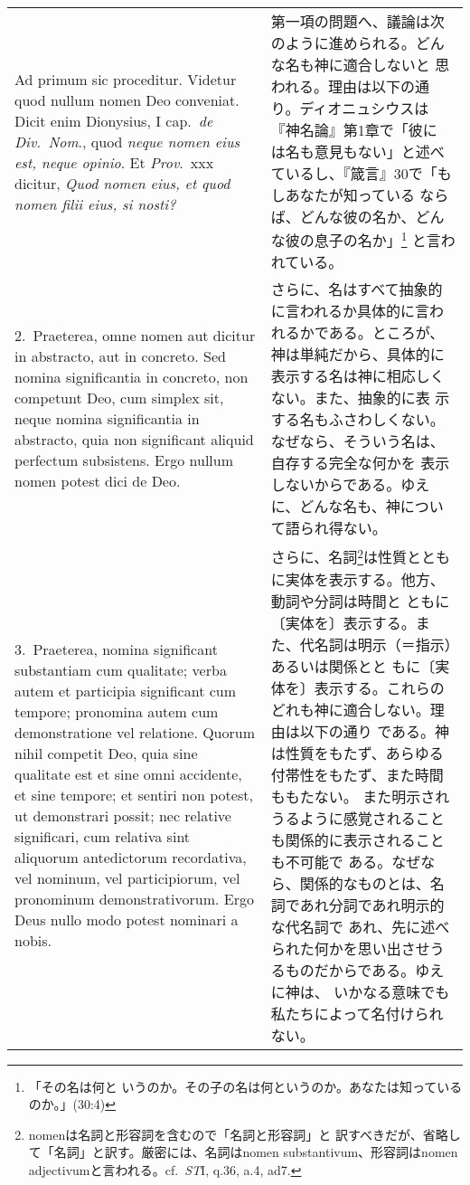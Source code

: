 \documentclass[10pt]{jsarticle}
\begin{document}
\begin{longtable}{p{21em}p{21em}}

{\sc Ad primum sic proceditur}. Videtur quod nullum nomen Deo
conveniat. Dicit enim Dionysius, I cap.\ {\it de Div.\ Nom}., quod {\it neque nomen
eius est, neque opinio}. Et {\it Prov}.\ {\sc xxx} dicitur, {\it Quod nomen eius, et quod nomen filii eius, si nosti?}

&

第一項の問題へ、議論は次のように進められる。どんな名も神に適合しないと
思われる。理由は以下の通り。ディオニュシウスは『神名論』第1章で「彼に
は名も意見もない」と述べているし、『箴言』30で「もしあなたが知っている
ならば、どんな彼の名か、どんな彼の息子の名か」\footnote{「その名は何と
いうのか。その子の名は何というのか。あなたは知っているのか。」(30:4)}
と言われている。

\\

2.~{\sc Praeterea}, omne nomen aut dicitur in abstracto, aut in
concreto. Sed nomina significantia in concreto, non competunt Deo, cum
simplex sit, neque nomina significantia in abstracto, quia non
significant aliquid perfectum subsistens. Ergo nullum nomen potest
dici de Deo.

&

さらに、名はすべて抽象的に言われるか具体的に言われるかである。ところが、
神は単純だから、具体的に表示する名は神に相応しくない。また、抽象的に表
示する名もふさわしくない。なぜなら、そういう名は、自存する完全な何かを
表示しないからである。ゆえに、どんな名も、神について語られ得ない。

\\

3.~{\sc Praeterea}, nomina significant substantiam cum qualitate;
verba autem et participia significant cum tempore; pronomina autem cum
demonstratione vel relatione. Quorum nihil competit Deo, quia sine
qualitate est et sine omni accidente, et sine tempore; et sentiri non
potest, ut demonstrari possit; nec relative significari, cum relativa
sint aliquorum antedictorum recordativa, vel nominum, vel
participiorum, vel pronominum demonstrativorum. Ergo Deus nullo modo
potest nominari a nobis.

&

さらに、名詞\footnote{nomenは名詞と形容詞を含むので「名詞と形容詞」と
訳すべきだが、省略して「名詞」と訳す。厳密には、名詞はnomen
substantivum、形容詞はnomen adjectivumと言われる。cf.~{\itshape ST}I,
q.36, a.4, ad7.}は性質とともに実体を表示する。他方、動詞や分詞は時間と
ともに〔実体を〕表示する。また、代名詞は明示（＝指示）あるいは関係とと
もに〔実体を〕表示する。これらのどれも神に適合しない。理由は以下の通り
である。神は性質をもたず、あらゆる付帯性をもたず、また時間ももたない。
また明示されうるように感覚されることも関係的に表示されることも不可能で
ある。なぜなら、関係的なものとは、名詞であれ分詞であれ明示的な代名詞で
あれ、先に述べられた何かを思い出させうるものだからである。ゆえに神は、
いかなる意味でも私たちによって名付けられない。


\end{longtable}
\end{document}
